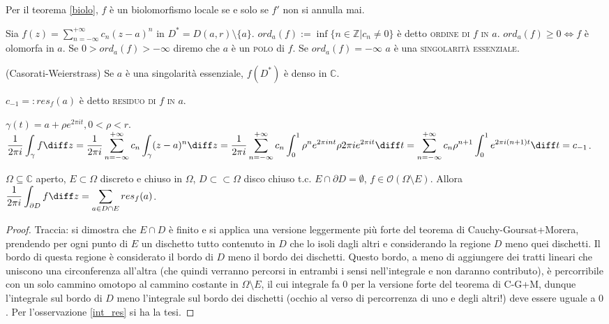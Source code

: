 Per il teorema \ref{biolo}, $f$ è un biolomorfismo locale se e solo se $f'$ non si annulla mai.

\begin{defn}
  Sia $\displaystyle f(z)=\sum_{n=-\infty}^{+\infty} c_n(z-a)^n$ in $D^*=D(a, r) \setminus \{a\}$. $ord_a(f):=\inf\{n \in \mathbb{Z} | c_n \not=0\}$ è detto \textsc{ordine di $f$ in $a$}. $ord_a(f) \ge 0 \Leftrightarrow f$ è olomorfa in $a$.
  Se $0>ord_a(f)>-\infty$ diremo che $a$ è un \textsc{polo} di $f$. Se $ord_a(f)=-\infty$ $a$ è una \textsc{singolarità essenziale}.
\end{defn}

\begin{thm}
  (Casorati-Weierstrass) Se $a$ è una singolarità essenziale, $f(D^*)$ è denso in $\mathbb{C}$.
\end{thm}

\begin{defn}
  $c_{-1}=:res_f(a)$ è detto \textsc{residuo di $f$ in $a$}.
\end{defn}

\begin{oss} \label{int_res}
  $\gamma(t)=a+\rho e^{2\pi i t}, 0<\rho<r$. \\
  $\displaystyle \frac{1}{2\pi i} \int_{\gamma} f \diff z=\frac{1}{2\pi i} \sum_{n=-\infty}^{+\infty} c_n \int_{\gamma} (z-a)^n \diff z= \\ \frac{1}{2\pi i} \sum_{n=-\infty}^{+\infty} c_n \int_0^1 \rho^ne^{2\pi i n t} \rho 2 \pi i e^{2\pi i t} \diff t=\sum_{n=-\infty}^{+\infty} c_n \rho^{n+1} \int_0^1 e^{2\pi i (n+1)t} \diff t=c_{-1}$.
\end{oss}

\begin{prop}
  $\Omega \subseteq \mathbb{C}$ aperto, $E \subset \Omega$ discreto e chiuso in $\Omega$, $D \subset \subset \Omega$ disco chiuso t.c. $E \cap \partial D=\emptyset$, $f\in \mathcal{O}(\Omega \setminus E)$.
  Allora $\displaystyle \frac{1}{2\pi i}\int_{\partial D} f \diff z=\sum_{a \in D \cap E} res_f(a)$.
\end{prop}

\begin{proof}
  Traccia: si dimostra che $E \cap D$ è finito e si applica una versione leggermente più forte del teorema di Cauchy-Goursat+Morera, prendendo per ogni punto di $E$ un dischetto tutto contenuto in $D$ che lo isoli dagli altri e considerando la regione $D$ meno quei dischetti. Il bordo di questa regione è considerato il bordo di $D$ meno il bordo dei dischetti. Questo bordo, a meno di aggiungere dei tratti lineari che uniscono una circonferenza all'altra (che quindi verranno percorsi in entrambi i sensi nell'integrale e non daranno contributo), è percorribile con un solo cammino omotopo al cammino costante in $\Omega \setminus E$, il cui integrale fa $0$ per la versione forte del teorema di C-G+M, dunque l'integrale sul bordo di $D$ meno l'integrale sul bordo dei dischetti (occhio al verso di percorrenza di uno e degli altri!) deve essere uguale a $0$. Per l'osservazione \ref{int_res} si ha la tesi.
\end{proof}

